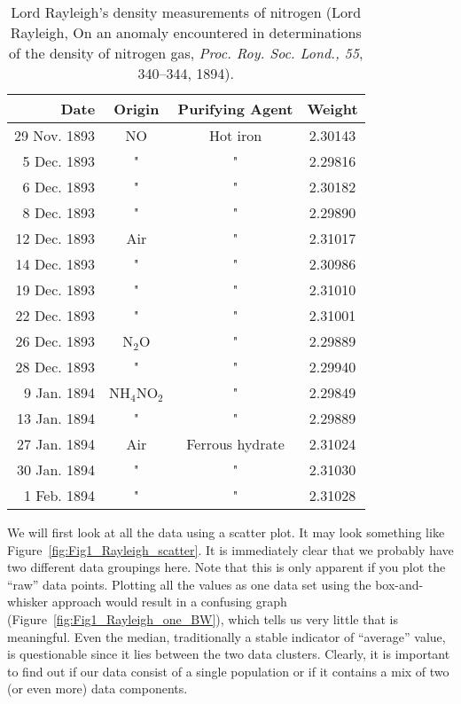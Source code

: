 \begin{table}[h]
\centering
\begin{tabular}{|r|c|c|c|} \hline
\bf{Date} & \bf{Origin} &  \bf{Purifying Agent} & \bf{Weight} \\ \hline
29 Nov. 1893 &       NO     &    Hot iron     & 2.30143 \\
 5 Dec. 1893 &       "      &        "        & 2.29816 \\
 6 Dec. 1893 &       "      &        "        & 2.30182 \\
 8 Dec. 1893 &       "      &        "        & 2.29890 \\
12 Dec. 1893 &      Air     &        "        & 2.31017 \\
14 Dec. 1893 &       "      &        "        & 2.30986 \\
19 Dec. 1893 &       "      &        "        & 2.31010 \\
22 Dec. 1893 &       "      &        "        & 2.31001 \\
26 Dec. 1893 &    N$_2$O    &        "        & 2.29889 \\
28 Dec. 1893 &       "      &        "        & 2.29940 \\
 9 Jan. 1894 & NH$_4$NO$_2$ &        "        & 2.29849 \\
13 Jan. 1894 &       "      &        "        & 2.29889 \\
27 Jan. 1894 &      Air     & Ferrous hydrate & 2.31024 \\
30 Jan. 1894 &       "      &        "        & 2.31030 \\
 1 Feb. 1894 &       "      &        "        & 2.31028 \\ \hline
\end{tabular}
\caption{Lord Rayleigh's density measurements of nitrogen (Lord Rayleigh,
On an anomaly encountered in determinations of the density of nitrogen gas, \emph{Proc. Roy. Soc. Lond., 55}, 
340--344, 1894).}
\label{tbl:nitrogen}
\end{table}


We will first look at all the data using a scatter plot.  It may look something like 
Figure~\ref{fig:Fig1_Rayleigh_scatter}.
It is immediately clear that we probably have two different data groupings here.  Note that this is only apparent if you 
plot the ``raw'' data points.  Plotting all the values as one data set using the box-and-whisker 
approach would result in a confusing graph (Figure~\ref{fig:Fig1_Rayleigh_one_BW}), which tells us very little that is meaningful.  
Even the median, traditionally a stable indicator of ``average'' value, is questionable since it lies 
between the two data clusters.  Clearly, it is important to find out if our data consist of a single 
population or if it contains a mix of two (or even more) data components.
 
